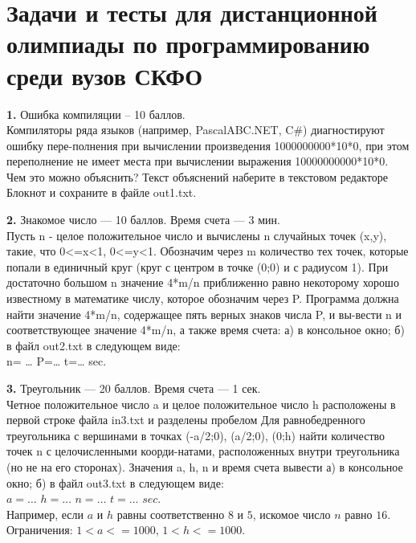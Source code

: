 \section{Задачи и тесты для дистанционной олимпиады по программированию среди вузов СКФО}\label{akm3-chap}






\textbf{1.} Ошибка компиляции – 10 баллов.\\
Компиляторы ряда языков (например, PascalABC.NET, C\#) диагностируют ошибку пере-полнения при вычислении произведения
1000000000*10*0,
при этом переполнение не имеет места при вычислении выражения 10000000000*10*0.
\\
Чем это можно объяснить? Текст объяснений наберите в текстовом редакторе Блокнот и сохраните в файле out1.txt.


\textbf{2.} Знакомое число --- 10 баллов. Время счета --- 3 мин.\\
Пусть n - целое положительное число и вычислены n случайных точек (x,y), такие, что 0<=x<1, 0<=y<1. Обозначим через m количество тех точек, которые попали в единичный круг (круг с центром в точке (0;0) и с радиусом 1). При достаточно большом n значение 4*m/n приближенно равно некоторому хорошо известному в математике числу, которое обозначим через P.
Программа должна найти значение 4*m/n, содержащее пять верных знаков числа P, и вы-вести n и соответствующее значение 4*m/n, а также время счета: а) в консольное окно; б) в файл out2.txt в следующем виде:\\
n= …         P=…         t=…    sec.


\textbf{3.} Треугольник --- 20 баллов. Время счета --- 1 сек.\\
Четное положительное число a и целое положительное число h расположены в первой строке файла in3.txt и разделены пробелом Для равнобедренного треугольника с вершинами в точках (-a/2;0), (a/2;0), (0;h) найти количество точек n с целочисленными коорди-натами, расположенных внутри треугольника (но не на его сторонах). Значения a, h, n и время счета вывести а) в консольное окно; б) в файл out3.txt в следующем виде:\\
$a = \ldots$ $h= \ldots$ $n= \ldots$ $t= \ldots$ $sec$.\\
Например, если $a$ и $h$ равны соответственно $8$ и $5$, искомое число $n$ равно $16$.\\
Ограничения: $1<a<=1000$, $1<h<=1000$.


